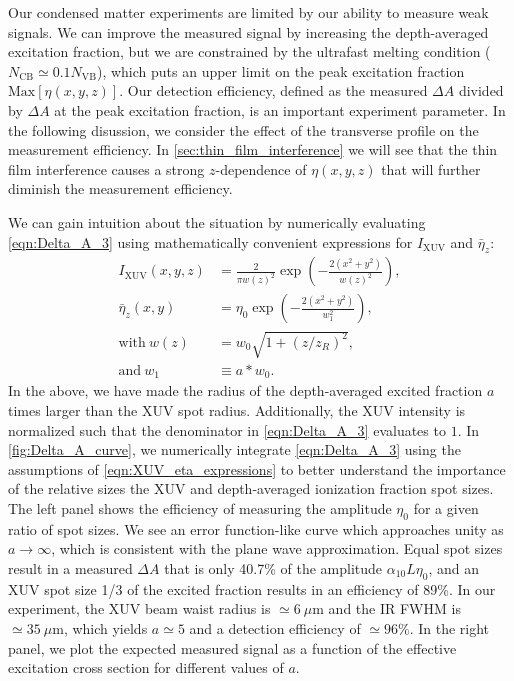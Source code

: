 Our condensed matter experiments are limited by our ability to measure weak signals. We can improve the measured signal by increasing the depth-averaged excitation fraction, but we are constrained by the ultrafast melting condition ($N_{\textrm{CB}} \simeq 0.1 N_{\textrm{VB}}$), which puts an upper limit on the peak excitation fraction $\textrm{Max}[\eta(x,y,z)]$. Our detection efficiency, defined as the measured $\Delta A$ divided by $\Delta A$ at the peak excitation fraction, is an important experiment parameter. In the following disussion, we consider the effect of the transverse profile on the measurement efficiency. In \cref{sec:thin_film_interference} we will see that the thin film interference causes a strong $z$-dependence of $\eta(x,y,z)$ that will further diminish the measurement efficiency.

We can gain intuition about the situation by numerically evaluating \cref{eqn:Delta_A_3} using mathematically convenient expressions for $I_{\textrm{XUV}}$ and $\bar{\eta}_z$:
\begin{equation}
\begin{aligned}
I_{\textrm{XUV}} (x,y,z) &= \frac{2}{\pi w(z)^2} \exp \left( - \frac{2 (x^2 + y^2)}{w(z)^2} \right), \\
\bar{\eta}_z(x,y) &= \eta_0 \exp \left( -\frac{2(x^2 + y^2)}{w_1^2} \right), \\
\textrm{with} \ w(z) &= w_0 \sqrt{1 + (z/z_R)^2}, \\
\textrm{and} \ w_1 &\equiv a*w_0.
\end{aligned}
\label{eqn:XUV_eta_expressions}
\end{equation}
In the above, we have made the radius of the depth-averaged excited fraction $a$ times larger than the XUV spot radius. Additionally, the XUV intensity is normalized such that the denominator in \cref{eqn:Delta_A_3} evaluates to $1$. In \cref{fig:Delta_A_curve}, we numerically integrate \cref{eqn:Delta_A_3} using the assumptions of \cref{eqn:XUV_eta_expressions} to better understand the importance of the relative sizes the XUV and depth-averaged ionization fraction spot sizes. The left panel shows the efficiency of measuring the amplitude $\eta_0$ for a given ratio of spot sizes. We see an error function-like curve which approaches unity as $a \rightarrow \infty$, which is consistent with the plane wave approximation. Equal spot sizes result in a measured $\Delta A$ that is only 40.7\% of the amplitude $\alpha_{10} L \eta_0$, and an XUV spot size 1/3 of the excited fraction results in an efficiency of 89\%. In our experiment, the XUV beam waist radius is $\simeq 6 \ \mu \textrm{m}$ and the IR FWHM is $\simeq 35 \ \mu \textrm{m}$, which yields $a \simeq 5$ and a detection efficiency of $\simeq 96\%$. In the right panel, we plot the expected measured signal as a function of the effective excitation cross section for different values of $a$.

